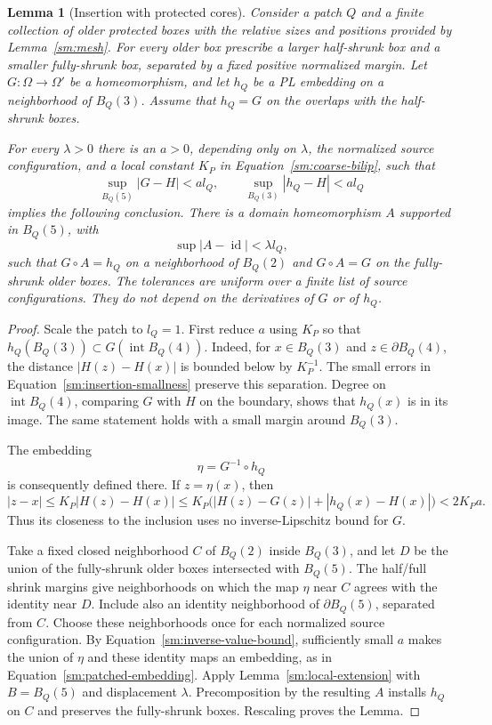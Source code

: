 \documentclass[11pt]{article}
\numberwithin{equation}{section}
\newtheorem{lemma}[theorem]{Lemma}
\theoremstyle{definition}
\theoremstyle{remark}
\newcommand{\Id}{\operatorname{id}}
\begin{document}
\begin{lemma}[Insertion with protected cores]
\label{sm:insertion}
Consider a patch $Q$ and a finite collection of older protected
boxes with the relative sizes and positions provided by
Lemma~\ref{sm:mesh}.  For every older box prescribe a larger
half-shrunk box and a smaller fully-shrunk box, separated by a
fixed positive normalized margin.  Let $G:\Omega\to\Omega'$ be
a homeomorphism, and let $h_Q$ be a PL embedding on a neighborhood
of $B_Q(3)$.  Assume that $h_Q=G$ on the overlaps with the
half-shrunk boxes.

For every $\lambda>0$ there is an $a>0$, depending only on
$\lambda$, the normalized source configuration, and a local
constant $K_P$ in Equation~\eqref{sm:coarse-bilip}, such that
\begin{equation}
 \label{sm:insertion-smallness}
 \sup_{B_Q(5)}|G-H|<a l_Q,
 \qquad \sup_{B_Q(3)}|h_Q-H|<a l_Q
\end{equation}
implies the following conclusion.  There is a domain
homeomorphism $A$ supported in $B_Q(5)$, with
\[
 \sup|A-\Id|<\lambda l_Q,
\]
such that $G\circ A=h_Q$ on a neighborhood of $B_Q(2)$ and
$G\circ A=G$ on the fully-shrunk older boxes.  The tolerances
are uniform over a finite list of source configurations.  They
do not depend on the derivatives of $G$ or of $h_Q$.
\end{lemma}

\begin{proof}
Scale the patch to $l_Q=1$.  First reduce $a$ using $K_P$ so
that $h_Q(B_Q(3))\subset G(\operatorname{int}B_Q(4))$.
Indeed, for $x\in B_Q(3)$ and $z\in\partial B_Q(4)$,
the distance $|H(z)-H(x)|$ is bounded below by $K_P^{-1}$.
The small errors in Equation~\eqref{sm:insertion-smallness} preserve
this separation.  Degree on $\operatorname{int}B_Q(4)$,
comparing $G$ with $H$ on the boundary, shows that $h_Q(x)$
is in its image.  The same statement holds with a small
margin around $B_Q(3)$.

The embedding
\[
 \eta=G^{-1}\circ h_Q
\]
is consequently defined there.  If $z=\eta(x)$, then
\begin{equation}
 \label{sm:inverse-value-bound}
 |z-x|\le K_P|H(z)-H(x)|
 \le K_P\bigl(|H(z)-G(z)|+|h_Q(x)-H(x)|\bigr)
 <2K_Pa.
\end{equation}
Thus its closeness to the inclusion uses no inverse-Lipschitz
bound for $G$.

Take a fixed closed neighborhood $C$ of $B_Q(2)$ inside
$B_Q(3)$, and let $D$ be the union of the fully-shrunk older
boxes intersected with $B_Q(5)$.  The half/full shrink margins
give neighborhoods on which the map $\eta$ near $C$ agrees
with the identity near $D$.  Include also an identity
neighborhood of $\partial B_Q(5)$, separated from $C$.
Choose these neighborhoods once for each normalized source
configuration.  By Equation~\eqref{sm:inverse-value-bound}, sufficiently
small $a$ makes the union of $\eta$ and these identity maps
an embedding, as in Equation~\eqref{sm:patched-embedding}.  Apply
Lemma~\ref{sm:local-extension} with $B=B_Q(5)$ and displacement
$\lambda$.  Precomposition by the resulting $A$ installs
$h_Q$ on $C$ and preserves the fully-shrunk boxes.  Rescaling
proves the Lemma.
\end{proof}
\end{document}
